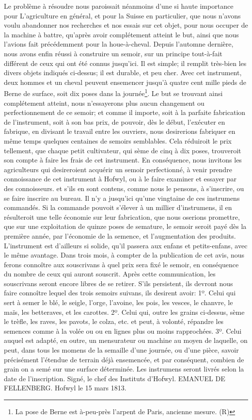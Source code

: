 Le problème à résoudre nous paroissait néanmoins d'une si haute importance pour\setcounter{page}{115} L'agriculture en général, et pour la Suisse en particulier, que nous n'avons voulu abandonner nos recherches et nos essais sur cet objet, pour nous occuper de la machine à battre, qu'après avoir complétement atteint le but, ainsi que nous l'avions fait précédemment pour la houe-à-cheval. Depuis l'automne dernière, nous avons enfin réussi à construire un semoir, sur un principe tout-à-fait différent de ceux qui ont été connus jusqu'ici. Il est simple; il remplit très-bien les divers objets indiqués ci-dessus; il est durable, et peu cher. Avec cet instrument, deux hommes et un cheval peuvent ensemencer jusqu'à quatre cent mille pieds de Berne de surface, soit dix poses dans la journée\footnote{La pose de Berne est à-peu-près l'arpent de Paris, ancienne mesure. (R)}.
Le but se trouvant ainsi complétement atteint, nous n'essayerons plus aucun changement ou perfectionnement de ce semoir; et comme il importe, soit à la parfaite fabrication de l'instrument, soit à son bas prix, de pouvoir, dès le début, l'exécuter en fabrique, en divisant le travail entre les ouvriers, nous desirerions fabriquer en même temps quelques centaines de semoirs semblables. Cela réduiroit le prix tellement, que chaque petit cultivateur, qui sème de cinq à dix poses, trouveroit son compte à faire les frais de cet instrument.
En conséquence, nous invitons les agriculteurs qui desireroient acquérir un semoir perfectionné, à venir prendre connoissance de cet instrument à Hofwyl, ou à le faire examiner et essayer par des connoisseurs.\setcounter{page}{116} et s'ils en sont contens, comme nous le pensons, à s'inscrire, ou se faire inscrire au bureau. Il n'y a jusqu'ici qu'une vingtaine de ces instrumens commandés. Si la commande pouvoit s'élever à un millier d'instrumens, il en résulteroit une telle économie sur leur fabrication, que nous oserions promettre, que sur une exploitation de quinze poses de semature, le semoir seroit payé dès la première année, par l'économie de la semence, et l'augmentation des produits. L'instrument est d'ailleurs si solide, qu'il passera aux enfans et petits-enfans, avec le même avantage.
Dans trois mois, à compter de la publication de cet avis, nous ferons connoître aux souscrivans à quel prix sera fixé le semoir, en conséquence du nombre de ceux qui auront souscrit. Après cette communication, les souscrivans seront encore libres de se retirer. S'ils persistent, ils devront nous faire connoître lequel des trois semoirs suivans, ils desirent avoir:
1º. Celui qui sert à semer le blé, le seigle, l'orge, l'avoine, les pois, les vesces, le chanvre, le maïs, les betteraves, et les carottes.
2º. Celui qui, outre les grains ci-dessus, sème le trèfle, les raves, les pavots, le colza, etc. et peut, à volonté, répandre les semences comme à la volée ou ou en lignes plus ou moins rapprochées.
3º. Celui auquel est adapté, en outre, un mensurateur ou machine au moyen de laquelle, on peut, dans tous les momens de la semaille d'une journée, ou d'une pièce, savoir précisément l'étendue de terrain déjà ensemencée, et par conséquent, combien de grain on a semé sur une surface déterminée.
Les instrumens seront livrés selon la date de l'inscription.
Signé, le chef des Instituts d'Hofwyl.
EMANUEL DE FELLENBERG.
Hofwyl le 15 mars 1813.